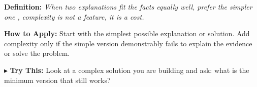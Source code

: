 \begin{tcolorbox}[title={\small \textbf{08 | Occam's Razor}},
  colback=blue!5!white, colframe=blue!40!black,
  fonttitle=\bfseries\small, boxrule=0.5pt]
\textbf{Definition:} \textit{When two explanations fit the facts equally well, prefer the simpler one , complexity is not a feature, it is a cost.}

\medskip
\textbf{How to Apply:} Start with the simplest possible explanation or solution. Add complexity only if the simple version demonstrably fails to explain the evidence or solve the problem.

\medskip
$\blacktriangleright$ \textbf{Try This:} Look at a complex solution you are building and ask: what is the minimum version that still works?
\end{tcolorbox} 

